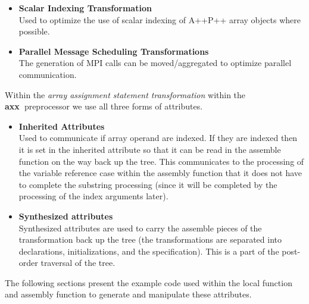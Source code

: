 \documentclass[10pt]{article}
\newcommand{\axx}{{\bf axx\ }}
\begin{document}
\begin{itemize}
     \item {\bf Scalar Indexing Transformation} \\ Used to optimize the use of scalar indexing of
     A++\/P++ array objects where possible.

     \item {\bf Parallel Message Scheduling Transformations} \\ The generation of MPI calls can be
     moved/aggregated to optimize parallel communication.
\end{itemize}

   Within the {\it array assignment statement transformation} within the \axx preprocessor we use all three forms of attributes.
\begin{itemize}
     \item {\bf Inherited Attributes} \\ Used to communicate if array operand are indexed.  If they
           are indexed then it is set in the inherited attribute so that it can be read in the
           assemble function on the way back up the tree.  This communicates to the processing of
           the variable reference case within the assembly function that it does not have to
           complete the substring processing (since it will be completed by the processing of the
           index arguments later).

     \item {\bf Synthesized attributes} \\ Synthesized attributes are used to carry the assemble
           pieces of the transformation back up the tree (the transformations are separated into
           declarations, initializations, and the specification).  This is a part of the post-order
           traversal of the tree.

\end{itemize}

The following sections present the example code used within the local function and assembly function
to generate and manipulate these attributes.
\end{document}
